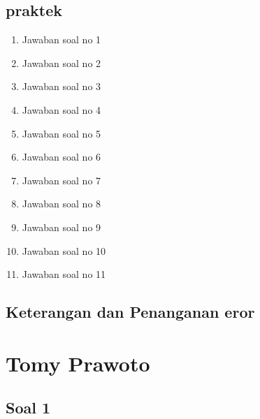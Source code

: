 \subsection{praktek}
\begin{enumerate}
	\item Jawaban soal no 1
	
	\item Jawaban soal no 2
	
	\item Jawaban soal no 3
	
	\item Jawaban soal no 4
	
	\item Jawaban soal no 5
	
	\item Jawaban soal no 6
	
	\item Jawaban soal no 7
	
	\item Jawaban soal no 8
	
	\item Jawaban soal no 9
	
	\item Jawaban soal no 10
	
	\item Jawaban soal no 11
	
\end{enumerate}

\subsection{Keterangan dan Penanganan eror}


\section{Tomy Prawoto}
\subsection{Soal 1}
